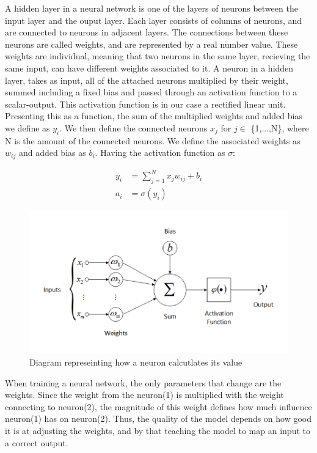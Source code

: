 A hidden layer in a neural network is one of the layers of neurons between the input layer and the ouput layer. Each layer consists of columns of neurons, and are connected to neurons in adjacent layers. The connections between these neurons are called weights, and are represented by a real number value. These weights are individual, meaning that two neurons in the same layer, recieving the same input, can have different weights associated to it. A neuron in a hidden layer, takes as input, all of the attached neurons multiplied by their weight, summed including a fixed bias and passed through an activation function to a scalar-output. This activation function is in our case a rectified linear unit.\\

\noindent
Presenting this as a function, the sum of the multiplied weights and added bias we define as $y_i$. We then define the connected neurons $x_j$ for $j \in$ \{1,...,N\}, where N is the amount of the connected neurons. We define the associated weights as $w_{ij}$ and added bias as $b_i$. Having the activation function as $\sigma$:

\begin{align}
  y_i &= \sum^N_{j=1} x_jw_{ij} + b_i\\
  a_i &= \sigma(y_i)
\end{align}


\begin{figure}[!ht]
  \centering
  \includegraphics[scale=1.0]{latex/imgs/neuronFunc.png}
  \caption{Diagram represeinting how a neuron calcutlates its value}\label{Baseline:before}
\end{figure}

\noindent
When training a neural network, the only parameters that change are the weights. Since the weight from the neuron(1) is multiplied with the weight connecting to neuron(2), the magnitude of this weight defines how much influence neuron(1) has on neuron(2). Thus, the quality of the model depends on how good it is at adjusting the weights, and by that teaching the model to map an input to a correct output.
